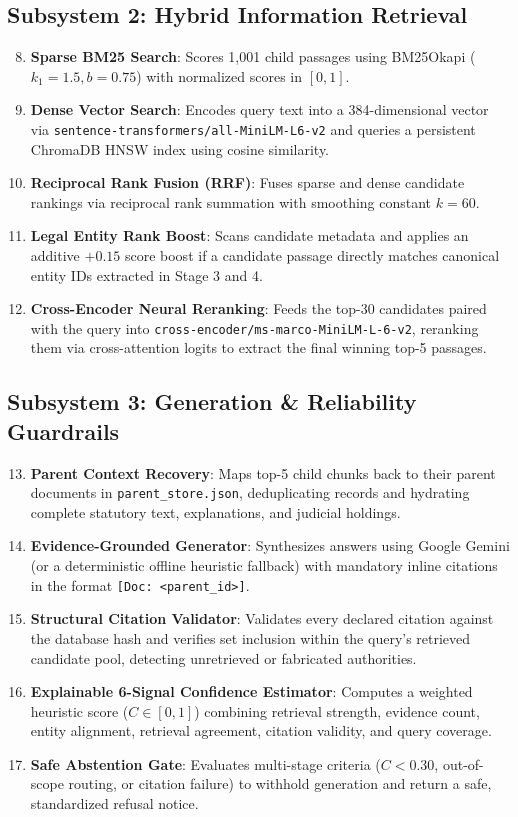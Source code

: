 \documentclass[10pt,twocolumn]{article}
\begin{document}
\subsection{Subsystem 2: Hybrid Information Retrieval}
\begin{enumerate}[leftmargin=*]
    \setcounter{enumi}{7}
    \item \textbf{Sparse BM25 Search}: Scores 1,001 child passages using BM25Okapi ($k_1=1.5, b=0.75$) with normalized scores in $[0, 1]$.
    \item \textbf{Dense Vector Search}: Encodes query text into a 384-dimensional vector via \texttt{sentence-transformers/all-MiniLM-L6-v2} and queries a persistent ChromaDB HNSW index using cosine similarity.
    \item \textbf{Reciprocal Rank Fusion (RRF)}: Fuses sparse and dense candidate rankings via reciprocal rank summation with smoothing constant $k=60$.
    \item \textbf{Legal Entity Rank Boost}: Scans candidate metadata and applies an additive $+0.15$ score boost if a candidate passage directly matches canonical entity IDs extracted in Stage 3 and 4.
    \item \textbf{Cross-Encoder Neural Reranking}: Feeds the top-30 candidates paired with the query into \texttt{cross-encoder/ms-marco-MiniLM-L-6-v2}, reranking them via cross-attention logits to extract the final winning top-5 passages.
\end{enumerate}

\subsection{Subsystem 3: Generation \& Reliability Guardrails}
\begin{enumerate}[leftmargin=*]
    \setcounter{enumi}{12}
    \item \textbf{Parent Context Recovery}: Maps top-5 child chunks back to their parent documents in \texttt{parent\_store.json}, deduplicating records and hydrating complete statutory text, explanations, and judicial holdings.
    \item \textbf{Evidence-Grounded Generator}: Synthesizes answers using Google Gemini (or a deterministic offline heuristic fallback) with mandatory inline citations in the format \texttt{[Doc: <parent\_id>]}.
    \item \textbf{Structural Citation Validator}: Validates every declared citation against the database hash and verifies set inclusion within the query's retrieved candidate pool, detecting unretrieved or fabricated authorities.
    \item \textbf{Explainable 6-Signal Confidence Estimator}: Computes a weighted heuristic score ($C \in [0, 1]$) combining retrieval strength, evidence count, entity alignment, retrieval agreement, citation validity, and query coverage.
    \item \textbf{Safe Abstention Gate}: Evaluates multi-stage criteria ($C < 0.30$, out-of-scope routing, or citation failure) to withhold generation and return a safe, standardized refusal notice.
\end{enumerate}
\end{document}
